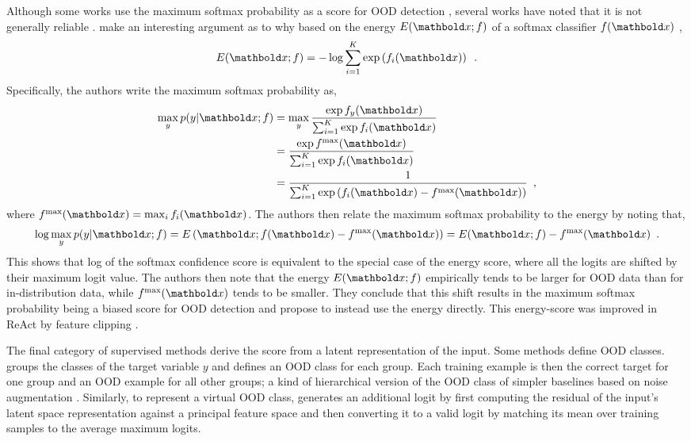 Although some works use the maximum softmax probability as a score for OOD detection \cite{hendrycks_deep_2019,ren_likelihood_2019}, several works have noted that it is not generally reliable \cite{hendrycks_scaling_2022,liu_energy-based_2020}. 
\textcite{liu_energy-based_2020} make an interesting argument as to why based on the energy $E(\xb; f)$ of a softmax classifier $f(\xb)$ \cite{lecun_tutorial_2006},
%
\begin{equation} \label{eq:softmax-classifier-energy}
    E(\xb; f) = - \log \sum_{i=1}^K \exp \left( f_i(\xb) \right) \enspace .
\end{equation}
%
Specifically, the authors write the maximum softmax probability as,
%
\begin{align} \label{eq:softmax-classifier-maximum-probability}
    \max_y p(y|\xb;f) 
    &= \max_y \frac{\exp f_y(\xb)}{\sum_{i=1}^K \exp f_i(\xb)} \nonumber \\
    &= \frac{\exp f^\text{max}(\xb)}{\sum_{i=1}^K \exp f_i(\xb)} \nonumber \\
    &= \frac{1}{\sum_{i=1}^K \exp \left(f_i(\xb) - f^\text{max}(\xb)\right)} \enspace ,
\end{align}
where $f^\text{max}(\xb) = \max_i f_i(\xb)$. 
The authors then relate the maximum softmax probability to the energy by noting that,
%
\begin{align}
    \log \max_y p(y|\xb;f) = E\left(\xb; f(\xb) - f^\text{max}(\xb)\right) = E(\xb; f) - f^\text{max}(\xb) \enspace .
\end{align}
%
This shows that log of the softmax confidence score is equivalent to the special case of the energy score, where all the logits are shifted by their maximum logit value. 
The authors then note that the energy $E(\xb; f)$ empirically tends to be larger for OOD data than for in-distribution data, while $f^\text{max}(\xb)$ tends to be smaller. 
They conclude that this shift results in the maximum softmax probability being a biased score for OOD detection and propose to instead use the energy directly. This energy-score was improved in ReAct by feature clipping \cite{sun_react_2021}. 

The final category of supervised methods derive the score from a latent representation of the input. 
Some methods define OOD classes. \textcite{huang_mos_2021} groups the classes of the target variable $y$ and defines an OOD class for each group. Each training example is then the correct target for one group and an OOD example for all other groups; a kind of hierarchical version of the OOD class of simpler baselines based on noise augmentation \cite{ren_likelihood_2019}. 
Similarly, to represent a virtual OOD class, \textcite{wang_vim_2022} generates an additional logit by first computing the residual of the input's latent space representation against a principal feature space and then converting it to a valid logit by matching its mean over training samples to the average maximum logits. 

